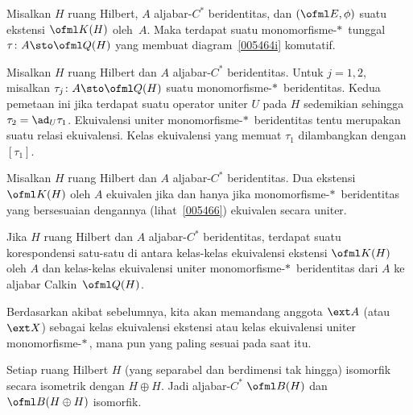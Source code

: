 \begin{prop}\label{005466} Misalkan $H$ ruang Hilbert, $A$ aljabar-$C^*$ beridentitas, dan
$(\ofml E,\phi)$ suatu ekstensi $\ofml K(H)$ oleh~$A$. Maka terdapat suatu
monomorfisme-$*\,$ tunggal $\tau \colon A \sto \ofml Q(H)$ yang membuat
diagram~\eqref{005464i} komutatif.
\end{prop}

\begin{defn} Misalkan $H$ ruang Hilbert dan $A$ aljabar-$C^*$ beridentitas. Untuk $j=1,2$, misalkan
$\tau_j\colon A \sto \ofml Q(H)$ suatu monomorfisme-$*\,$ beridentitas. Kedua pemetaan ini
 jika terdapat suatu operator uniter $U$ pada $H$ sedemikian sehingga $\tau_2 =
\ad_U \tau_1$. Ekuivalensi uniter monomorfisme-$*\,$ beridentitas tentu merupakan suatu
relasi ekuivalensi. Kelas ekuivalensi yang memuat $\tau_1$ dilambangkan
dengan~$[\tau_1]$.
\end{defn}

\begin{prop} Misalkan $H$ ruang Hilbert dan $A$ aljabar-$C^*$ beridentitas. Dua ekstensi
$\ofml K(H)$ oleh $A$ ekuivalen jika dan hanya jika monomorfisme-$*\,$ beridentitas yang
bersesuaian dengannya (lihat~\ref{005466}) ekuivalen secara uniter.
\end{prop}

\begin{cor} Jika $H$ ruang Hilbert dan $A$ aljabar-$C^*$ beridentitas, terdapat suatu korespondensi
satu-satu di antara kelas-kelas ekuivalensi ekstensi $\ofml K(H)$ oleh $A$ dan
kelas-kelas ekuivalensi uniter monomorfisme-$*\,$ beridentitas dari $A$ ke aljabar
Calkin~$\ofml Q(H)$.
\end{cor}

\begin{conv} Berdasarkan akibat sebelumnya, kita akan memandang anggota $\ext A$ (atau
$\ext X$) sebagai
kelas ekuivalensi ekstensi atau kelas ekuivalensi uniter monomorfisme-$*\,$,
mana pun yang paling sesuai pada saat itu.
\end{conv}

\begin{prop}\label{0054702} Setiap ruang Hilbert $H$ (yang separabel dan berdimensi tak hingga)
isomorfik secara isometrik dengan $H \oplus H$. Jadi aljabar-$C^*$ $\ofml B(H)$ dan $\ofml
B(H \oplus H)$ isomorfik.
\end{prop}

